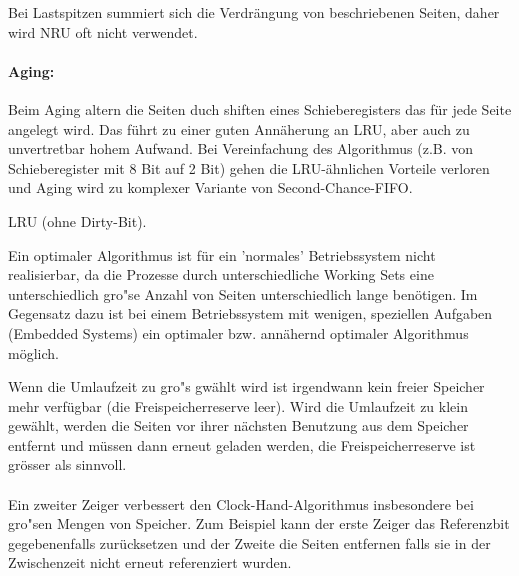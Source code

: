 \begin{answer}
  Bei Lastspitzen summiert sich die Verdrängung von beschriebenen Seiten, daher
  wird NRU oft nicht verwendet.
  
  \paragraph{Aging:}
  Beim Aging altern die Seiten duch shiften eines Schieberegisters das für jede Seite
  angelegt wird. Das führt zu einer guten Annäherung an LRU, aber auch zu unvertretbar
  hohem Aufwand. Bei Vereinfachung des Algorithmus (z.B. von Schieberegister
  mit 8 Bit auf 2 Bit) gehen die LRU-ähnlichen Vorteile verloren und Aging wird
  zu komplexer Variante von Second-Chance-FIFO.
\end{answer}

\begin{answer}
  LRU (ohne Dirty-Bit).
\end{answer}

\begin{multilinequestion}
\end{multilinequestion}

\begin{answer}
  Ein optimaler Algorithmus ist für ein 'normales' Betriebssystem nicht realisierbar, da die Prozesse
  durch unterschiedliche Working Sets eine unterschiedlich gro"se Anzahl von Seiten unterschiedlich
  lange benötigen.
  Im Gegensatz dazu ist bei einem Betriebssystem mit wenigen, speziellen Aufgaben (Embedded
  Systems) ein optimaler bzw. annähernd optimaler Algorithmus möglich.
\end{answer}

\begin{answer}
  Wenn die Umlaufzeit zu gro"s gwählt wird ist irgendwann kein freier Speicher mehr verfügbar (die Freispeicherreserve leer). Wird die Umlaufzeit zu klein gewählt, werden die Seiten vor ihrer nächsten Benutzung aus dem Speicher entfernt und müssen dann erneut geladen werden, die Freispeicherreserve ist grösser als sinnvoll.

  \paragraph*{}
  Ein zweiter Zeiger verbessert den Clock-Hand-Algorithmus insbesondere bei gro"sen Mengen von Speicher. Zum Beispiel kann der erste Zeiger das Referenzbit gegebenenfalls zurücksetzen und der Zweite die
  Seiten entfernen falls sie in der Zwischenzeit nicht erneut referenziert wurden.
\end{answer}

